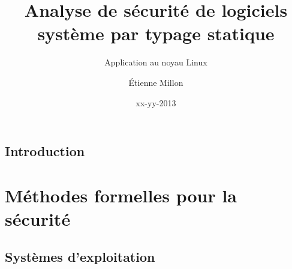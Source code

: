 \documentclass[a4paper,11pt]{memoir}
\title{Analyse de sécurité de logiciels système par typage statique}
\subtitle{Application au noyau Linux}
\author{Étienne Millon}
\date{xx-yy-2013}
\begin{document}
\frontmatter

\begin{titlingpage}
\titleUL{}
\end{titlingpage}






%

\clearpage


\tableofcontents

\mainmatter

\chapter{Introduction}

\label{cha:intro}




\part{Méthodes formelles pour la sécurité}
\label{part:ctx}


\chapter{Systèmes d'exploitation}

\label{cha:os}


\end{document}
